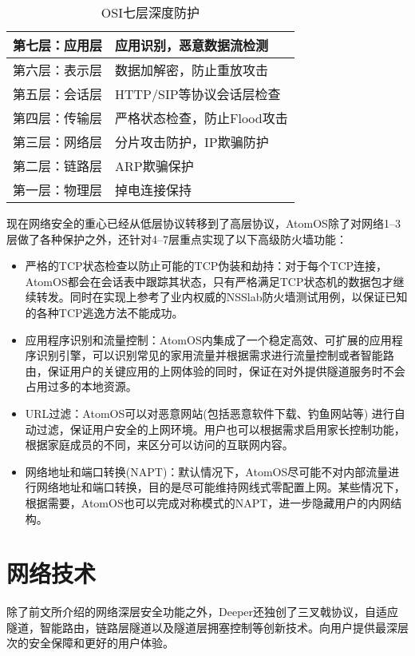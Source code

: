 \documentclass[a4paper]{article}
\begin{document}
\begin{table} [hh]
\centering
\begin{tabular}{|l|l|}
\hline
第七层：应用层 & 应用识别，恶意数据流检测 \\ \hline
第六层：表示层 & 数据加解密，防止重放攻击 \\ \hline
第五层：会话层 & HTTP/SIP等协议会话层检查 \\ \hline
第四层：传输层 & 严格状态检查，防止Flood攻击 \\ \hline
第三层：网络层 & 分片攻击防护，IP欺骗防护 \\ \hline
第二层：链路层 & ARP欺骗保护 \\ \hline
第一层：物理层 & 掉电连接保持 \\ \hline
\end{tabular}
\caption{OSI七层深度防护} \label{tab:osi}
\end{table}

现在网络安全的重心已经从低层协议转移到了高层协议，AtomOS除了对网络1–3层做了各种保护之外，还针对4–7层重点实现了以下高级防火墙功能：

\begin{itemize}
\item 严格的TCP状态检查以防止可能的TCP伪装和劫持：对于每个TCP连接，AtomOS都会在会话表中跟踪其状态，只有严格满足TCP状态机的数据包才继续转发。同时在实现上参考了业内权威的NSSlab防火墙测试用例，以保证已知的各种TCP逃逸方法不能成功。

\item 应用程序识别和流量控制：AtomOS内集成了一个稳定高效、可扩展的应用程序识别引擎，可以识别常见的家用流量并根据需求进行流量控制或者智能路由，保证用户的关键应用的上网体验的同时，保证在对外提供隧道服务时不会占用过多的本地资源。

\item URL过滤：AtomOS可以对恶意网站(包括恶意软件下载、钓鱼网站等) 进行自动过滤，保证用户安全的上网环境。用户也可以根据需求启用家长控制功能，根据家庭成员的不同，来区分可以访问的互联网内容。

\item 网络地址和端口转换(NAPT)：默认情况下，AtomOS尽可能不对内部流量进行网络地址和端口转换，目的是尽可能维持网线式零配置上网。某些情况下，根据需要，AtomOS也可以完成对称模式的NAPT，进一步隐藏用户的内网结构。
\end{itemize}

\newpage
\section{网络技术}
除了前文所介绍的网络深层安全功能之外，Deeper还独创了三叉戟协议，自适应隧道，智能路由，链路层隧道以及隧道层拥塞控制等创新技术。向用户提供最深层次的安全保障和更好的用户体验。
\end{document}
